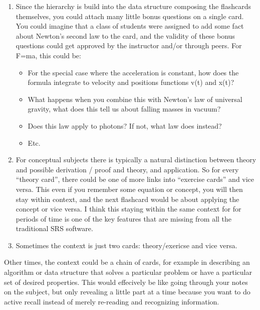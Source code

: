 \begin{enumerate}
\def\labelenumi{\arabic{enumi}.}
\item
  Since the hierarchy is build into the data structure composing the
  flashcards themselves, you could attach many little bonus questions on
  a single card. You could imagine that a class of students were
  assigned to add some fact about Newton's second law to the card, and
  the validity of these bonus questions could get approved by the
  instructor and/or through peers. For F=ma, this could be:

  \begin{itemize}
  \tightlist
  \item
    For the special case where the acceleration is constant, how does
    the formula integrate to velocity and positions functions v(t) and
    x(t)?
  \item
    What happens when you combine this with Newton's law of universal
    gravity, what does this tell us about falling masses in vacuum?
  \item
    Does this law apply to photons? If not, what law does instead?
  \item
    Etc.
  \end{itemize}
\item
  For conceptual subjects there is typically a natural distinction
  between theory and possible derivation / proof and theory, and
  application. So for every ``theory card'', there could be one of more
  links into ``exercise cards'' and vice versa. This even if you
  remember some equation or concept, you will then stay within context,
  and the next flashcard would be about applying the concept or vice
  versa. I think this staying within the same context for for periods of
  time is one of the key features that are missing from all the
  traditional SRS software.
\item
  Sometimes the context is just two cards: theory/exericse and vice
  versa.
\end{enumerate}

Other times, the context could be a chain of cards, for example in
describing an algorithm or data structure that solves a particular
problem or have a particular set of desired properties. This would
effecively be like going through your notes on the subject, but only
revealing a little part at a time because you want to do active recall
instead of merely re-reading and recognizing information.

